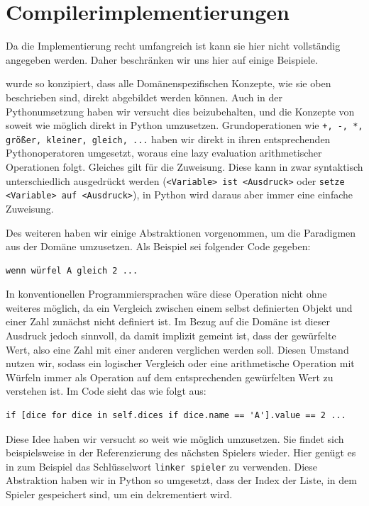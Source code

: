 \section{Compilerimplementierungen}
\label{sec:compilerimplementierungen}
	Da die Implementierung recht umfangreich ist kann sie hier nicht vollständig angegeben werden. Daher beschränken wir uns hier auf einige Beispiele.
	
\dg wurde so konzipiert, dass alle Domänenspezifischen Konzepte, wie sie oben beschrieben sind, direkt abgebildet werden können. Auch in der Pythonumsetzung haben wir versucht dies beizubehalten, und die Konzepte von \dg soweit wie möglich direkt in Python umzusetzen. Grundoperationen wie \texttt{+, -, *, größer, kleiner, gleich, ...} haben wir direkt in ihren entsprechenden Pythonoperatoren umgesetzt, woraus eine lazy evaluation arithmetischer Operationen folgt. Gleiches gilt für die Zuweisung. Diese kann in \dg zwar syntaktisch unterschiedlich ausgedrückt werden (\texttt{<Variable> ist <Ausdruck>} oder \texttt{setze <Variable> auf <Ausdruck>}), in Python wird daraus aber immer eine einfache Zuweisung.
	
		Des weiteren haben wir einige Abstraktionen vorgenommen, um die Paradigmen aus der Domäne umzusetzen. Als Beispiel sei folgender Code gegeben:
\begin{lstlisting}
wenn würfel A gleich 2 ...
\end{lstlisting}
		In konventionellen Programmiersprachen wäre diese Operation nicht ohne weiteres möglich, da ein Vergleich zwischen einem selbst definierten Objekt und einer Zahl zunächst nicht definiert ist. Im Bezug auf die Domäne ist dieser Ausdruck jedoch sinnvoll, da damit implizit gemeint ist, dass der gewürfelte Wert, also eine Zahl mit einer anderen verglichen werden soll. Diesen Umstand nutzen wir, sodass ein logischer Vergleich oder eine arithmetische Operation mit Würfeln immer als Operation auf dem entsprechenden gewürfelten Wert zu verstehen ist. Im Code sieht das wie folgt aus:

\begin{lstlisting}
if [dice for dice in self.dices if dice.name == 'A'].value == 2 ...
\end{lstlisting}
Diese Idee haben wir versucht so weit wie möglich umzusetzen. Sie findet sich beispielsweise in der Referenzierung des nächsten Spielers wieder. Hier genügt es in \dg zum Beispiel das Schlüsselwort \texttt{linker spieler} zu verwenden. Diese Abstraktion haben wir in Python so umgesetzt, dass der Index der Liste, in dem Spieler gespeichert sind, um ein dekrementiert wird.

